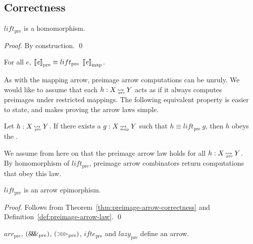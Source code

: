 \documentclass{llncs}
\newcommand{\arrow}{\rightsquigarrow}
\newcommand{\arrowlift}{\ensuremath{lift}}
\newcommand{\arrowarr}{\ensuremath{arr}}
\newcommand{\arrowcomp}{\ensuremath{{>}\mspace{-6mu}{>}\mspace{-6mu}{>}}}
\newcommand{\arrowpair}{\ensuremath{\mathit{\&\mspace{-7.5mu}\&\mspace{-7.5mu}\&}}}
\newcommand{\arrowif}{\ensuremath{ifte}}
\newcommand{\arrowlazy}{\ensuremath{lazy}}
\newcommand{\map}{_\mathrm{map}}
\DeclareMathOperator{\mapto}{\arrow_{\mspace{-21mu}\map}}
\newcommand{\pre}{_\mathrm{pre}}
\DeclareMathOperator{\preto}{\arrow_{\mspace{-19mu}\pre}}
\newcommand{\liftpre}{\arrowlift\pre}
\newcommand{\arrpre}{\arrowarr\pre}
\newcommand{\comppre}{\arrowcomp\pre}
\newcommand{\pairpre}{\arrowpair\pre}
\newcommand{\ifpre}{\arrowif\pre}
\newcommand{\lazypre}{\arrowlazy\pre}
\begin{document}
\subsection{Correctness}

\begin{theorem}
\label{thm:preimage-arrow-correctness}
$\liftpre$ is a homomorphism.%
\end{theorem}
\begin{proof}
By construction.
\qed
\end{proof}

\begin{corollary}
\label{cor:preimage-arrow-correctness}
For all $\mathit{e}$, $\meaningof{\mathit{e}}\pre \equiv \liftpre~\meaningof{\mathit{e}}\map$.%
\end{corollary}

As with the mapping arrow, preimage arrow computations can be unruly.
We would like to assume that each $h : X \preto Y$ acts as if it always computes preimages under restricted mappings.
The following equivalent property is easier to state, and makes proving the arrow laws simple.

\begin{definition}
\label{def:preimage-arrow-law}
Let $h : X \preto Y$. If there exists a $g : X \mapto Y$ such that $h \equiv \liftpre~g$, then $h$ obeys the .%
\end{definition}

We assume from here on that the preimage arrow law holds for all $h : X \preto Y$.
By homomorphism of $\liftpre$, preimage arrow combinators return computations that obey this law.

\begin{theorem}
$\liftpre$ is an arrow epimorphism.
\end{theorem}
\begin{proof}
Follows from Theorem~\ref{thm:preimage-arrow-correctness} and Definition~\ref{def:preimage-arrow-law}.
\qed
\end{proof}

\begin{corollary}
$\arrpre$, $(\pairpre)$, $(\comppre)$, $\ifpre$ and $\lazypre$ define an arrow.
\end{corollary}

\end{document}
